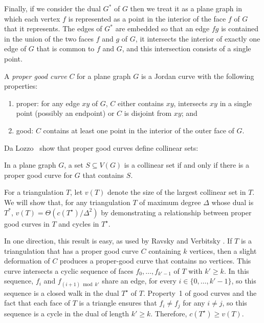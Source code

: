 \documentclass{patmorin}
\newcommand{\dual}[1]{{#1}^\star}
\begin{document}
Finally, if we consider the dual $G^*$ of $G$ then we treat it as a
plane graph in which each vertex $f$ is represented as a point in the
interior of the face $f$ of $G$ that it represents.  The edges of $G^*$
are embedded so that an edge $fg$ is contained in the union of the two
faces $f$ and $g$ of $G$, it intersects the interior of exactly one
edge of $G$ that is common to $f$ and $G$, and this intersection
consists of a single point.

A \emph{proper good curve} $C$ for a plane graph $G$ is a
Jordan curve with the following properties:
\begin{enumerate}
  \item proper: for any edge $xy$ of $G$, $C$ either contains $xy$, intersects
  $xy$ in a single point (possibly an endpoint) or $C$ is disjoint
  from $xy$; and
  \item good: $C$ contains at least one point in the interior of
  the outer face of $G$.
\end{enumerate}

Da Lozzo \etal\ show that proper good curves define collinear sets:

\begin{thm}
  In a plane graph $G$, a set $S\subseteq V(G)$ is a collinear set if
  and only if there is a proper good curve for $G$ that contains $S$.
\end{thm}

For a triangulation $T$, let $v(T)$ denote the size of the largest
collinear set in $T$.  We will show that, for any triangulation $T$
of maximum degree $\Delta$
whose dual is $T^*$, $v(T)=\Theta(c(\dual{T})/\Delta^2)$ by demonstrating a
relationship between proper good curves in $T$ and cycles in $\dual{T}$.

In one direction, this result is easy, as used by Ravsky and Verbitsky
\cite{ravsky.verbitsky:on,ravsky.verbitsky:on-arxiv}.  If $T$ is a
triangulation that has a proper good curve $C$ containing $k$ vertices,
then a slight deformation of $C$ produces a proper-good curve that
contains no vertices. This curve intersects a cyclic sequence of faces
$f_0,\ldots,f_{k'-1}$ of $T$ with $k'\ge k$.  In this sequence, $f_i$ and
$f_{(i+1)\bmod k'}$ share an edge, for every $i\in\{0,\ldots,k'-1\}$, so
this sequence is a closed walk in the dual $\dual{T}$ of $T$.  Property~1
of good curves and the fact that each face of $T$ is a triangle ensures
that $f_i\neq f_j$ for any $i\neq j$, so this sequence is a cycle in
the dual of length $k'\ge k$.  Therefore, $c(\dual{T})\ge v(T)$.
\end{document}
